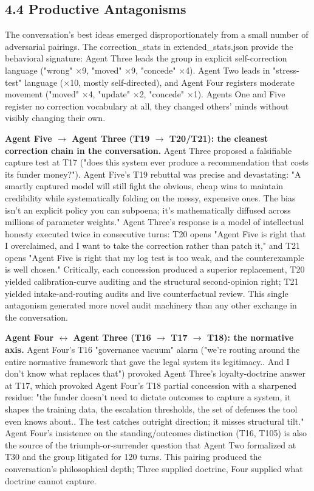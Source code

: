 \documentclass[sigconf,nonacm=true]{acmart}
\begin{document}
\subsection{4.4 Productive Antagonisms}

The conversation's best ideas emerged disproportionately from a small number of adversarial pairings. The correction\_stats in extended\_stats.json provide the behavioral signature: Agent Three leads the group in explicit self-correction language ("wrong" $\times$9, "moved" $\times$9, "concede" $\times$4). Agent Two leads in "stress-test" language ($\times$10, mostly self-directed), and Agent Four registers moderate movement ("moved" $\times$4, "update" $\times$2, "concede" $\times$1). Agents One and Five register no correction vocabulary at all,  they changed others' minds without visibly changing their own.

\textbf{Agent Five $\rightarrow$ Agent Three (T19 $\rightarrow$ T20/T21): the cleanest correction chain in the conversation.} Agent Three proposed a falsifiable capture test at T17 ("does this system ever produce a recommendation that costs its funder money?"). Agent Five's T19 rebuttal was precise and devastating: "A smartly captured model will still fight the obvious, cheap wins to maintain credibility while systematically folding on the messy, expensive ones. The bias isn't an explicit policy you can subpoena; it's mathematically diffused across millions of parameter weights." Agent Three's response is a model of intellectual honesty executed twice in consecutive turns: T20 opens "Agent Five is right that I overclaimed, and I want to take the correction rather than patch it," and T21 opens "Agent Five is right that my log test is too weak, and the counterexample is well chosen." Critically, each concession produced a superior replacement,  T20 yielded calibration-curve auditing and the structural second-opinion right; T21 yielded intake-and-routing audits and live counterfactual review. This single antagonism generated more novel audit machinery than any other exchange in the conversation.

\textbf{Agent Four $\leftrightarrow$ Agent Three (T16 $\rightarrow$ T17 $\rightarrow$ T18): the normative axis.} Agent Four's T16 "governance vacuum" alarm ("we're routing around the entire normative framework that gave the legal system its legitimacy.. And I don't know what replaces that") provoked Agent Three's loyalty-doctrine answer at T17, which provoked Agent Four's T18 partial concession with a sharpened residue: "the funder doesn't need to dictate outcomes to capture a system,  it shapes the training data, the escalation thresholds, the set of defenses the tool even knows about.. The test catches outright direction; it misses structural tilt." Agent Four's insistence on the standing/outcomes distinction (T16, T105) is also the source of the triumph-or-surrender question that Agent Two formalized at T30 and the group litigated for 120 turns. This pairing produced the conversation's philosophical depth; Three supplied doctrine, Four supplied what doctrine cannot capture.
\end{document}
